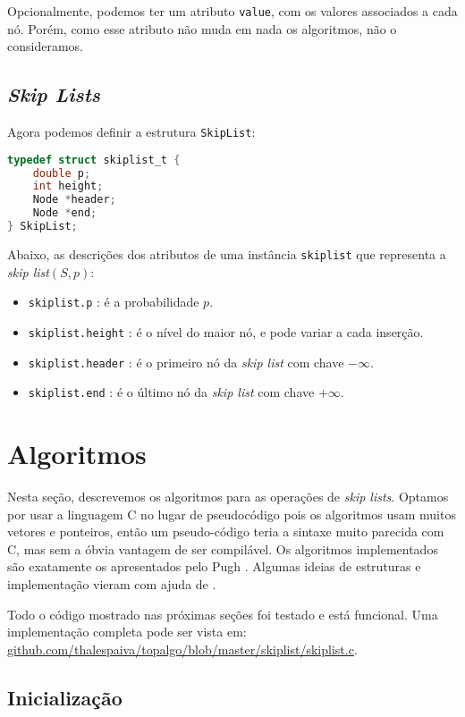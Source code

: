 \documentclass[paper=a4, fontsize=11pt]{scrartcl} %
\numberwithin{equation}{section}
\numberwithin{figure}{section}
\numberwithin{table}{section}
\numberwithin{definition}{section}
\numberwithin{theorem}{section}
\numberwithin{property}{section}
\numberwithin{proposition}{section}
\newcommand{\SLs}{\textit{Skip Lists}\xspace}
\newcommand{\sls}{\textit{skip lists}\xspace}
\newcommand{\skl}{\textit{skip list}\xspace}
\renewcommand{\sl}{\textit{skip list}\xspace}
\begin{document}
Opcionalmente, podemos ter um atributo \verb|value|, com os valores associados a cada nó. Porém, como esse
atributo não muda em nada os algoritmos, não o consideramos.

\subsection{\SLs}
Agora podemos definir a estrutura \verb|SkipList|:
\begin{lstlisting}[language=C]
typedef struct skiplist_t {
    double p;
    int height;
    Node *header;
    Node *end;
} SkipList;
\end{lstlisting}

Abaixo, as descrições dos atributos de uma instância \verb|skiplist| que representa a 
\skl $( S, p )$:

\begin{itemize}[noitemsep]
  \item \verb|skiplist.p| : é a probabilidade $p$.
  \item \verb|skiplist.height| : é o nível do maior nó, e pode variar a cada inserção.
  \item \verb|skiplist.header| : é o primeiro nó da \sl com chave $-\infty$.
  \item \verb|skiplist.end| : é o último nó da \sl com chave $+\infty$.
\end{itemize}


\section{Algoritmos}

Nesta seção, descrevemos os algoritmos para as operações de \sls. Optamos por usar a linguagem C no lugar de 
pseudocódigo pois os algoritmos usam muitos vetores e ponteiros, então um pseudo-código teria a sintaxe muito parecida com
C, mas sem a óbvia vantagem de ser compilável. Os algoritmos implementados são exatamente os apresentados pelo
Pugh \cite{pugh1990skip}. Algumas ideias de estruturas e implementação vieram com ajuda de \cite{goodrich2014data}.

Todo o código mostrado nas próximas seções foi testado e está funcional. Uma implementação completa pode ser vista 
em: \url{github.com/thalespaiva/topalgo/blob/master/skiplist/skiplist.c}.
  
\subsection{Inicialização}
\end{document}

